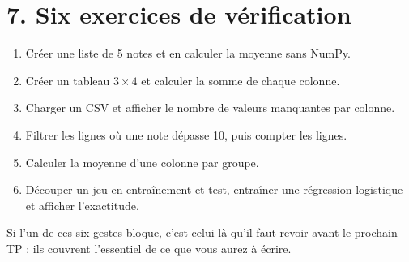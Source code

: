 \documentclass[9.5pt,a4paper]{article}
\begin{document}
\section*{\color{bleu}7. Six exercices de vérification}
\begin{enumerate}
  \item Créer une liste de 5 notes et en calculer la moyenne sans NumPy.
  \item Créer un tableau $3 \times 4$ et calculer la somme de chaque colonne.
  \item Charger un CSV et afficher le nombre de valeurs manquantes par colonne.
  \item Filtrer les lignes où une note dépasse 10, puis compter les lignes.
  \item Calculer la moyenne d'une colonne par groupe.
  \item Découper un jeu en entraînement et test, entraîner une régression
        logistique et afficher l'exactitude.
\end{enumerate}

\vspace{1mm}
{\footnotesize\color{gris}Si l'un de ces six gestes bloque, c'est celui-là
qu'il faut revoir avant le prochain TP : ils couvrent l'essentiel de ce que
vous aurez à écrire.}
\end{document}
